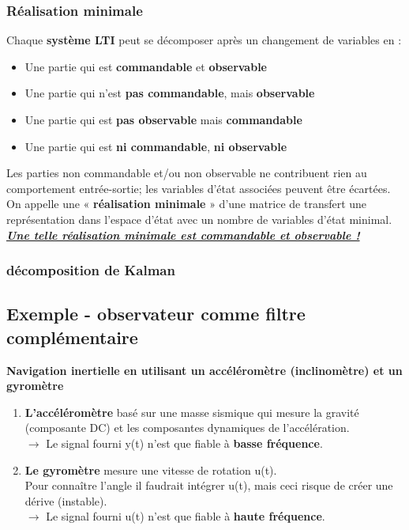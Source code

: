 \documentclass[document.tex]{subfiles}
\begin{document}
\subsubsection{Réalisation minimale}

Chaque \textbf{système LTI} peut se décomposer après un changement de variables en :
\begin{itemize}
\item Une partie qui est \textbf{commandable} et \textbf{observable}
\item Une partie qui n'est \textbf{pas commandable}, mais \textbf{observable}
\item Une partie qui est \textbf{pas observable} mais \textbf{commandable}
\item Une partie qui est \textbf{ni commandable}, \textbf{ni observable}
\end{itemize}

Les parties non commandable et/ou non observable ne contribuent rien au comportement entrée-sortie; les variables d'état associées peuvent être écartées.\\

On appelle une « \textbf{réalisation minimale} » d'une matrice de transfert une représentation dans l'espace d'état avec un nombre de variables d'état minimal.\\

\textit{\textbf{\underline{Une telle réalisation minimale est commandable et observable !}}}

\subsubsection{décomposition de Kalman}


\subsection{Exemple - observateur comme filtre complémentaire}

\textbf{Navigation inertielle en utilisant un accéléromètre (inclinomètre) et un gyromètre}


\begin{enumerate}
\item \textbf{L'accéléromètre} basé sur une masse sismique qui mesure la gravité (composante DC) et les composantes dynamiques de l'accélération.\\
$\longrightarrow$ Le signal fourni y(t) n'est que fiable à \textbf{basse fréquence}.
\item \textbf{Le gyromètre} mesure une vitesse de rotation u(t).\\
Pour connaître l'angle il faudrait intégrer u(t), mais ceci risque de créer une dérive (instable).\\
$\longrightarrow$ Le signal fourni u(t) n'est que fiable à \textbf{haute fréquence}.
\end{enumerate}
\end{document}
